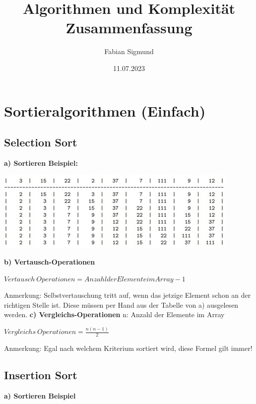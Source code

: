\documentclass[12pt]{article}
\title{Algorithmen und Komplexität Zusammenfassung}
\author{Fabian Sigmund}
\date{11.07.2023}
\begin{document}
	\maketitle
	\pagebreak
	\section{Sortieralgorithmen (Einfach)}
	\subsection{Selection Sort}
	
	\textbf{a) Sortieren Beispiel:}
	
	\includegraphics{SelectionSort}
	\break
	
	\textbf{b) Vertausch-Operationen} \hfill \break
	
			\begin{center}
		$Vertausch \ Operationen = Anzahl der Elemente im Array - 1$
	\end{center}
	
	Anmerkung: Selbstvertauschung tritt auf, wenn das jetzige Element schon an der richtigen Stelle ist. Diese müssen per Hand aus der Tabelle von a) ausgelesen werden.
	\newline
	\newline
	\textbf{c) Vergleichs-Operationen}
	\newline
	\newline
	n: Anzahl der Elemente im Array
	
	\begin{center}
		$Vergleichs \ Operationen = $\Large{$\frac{n(n-1)}{2}$}
	\end{center}
	
	Anmerkung: Egal nach welchem Kriterium sortiert wird, diese Formel gilt immer!
	
	\pagebreak
	
	
	\subsection{Insertion Sort}
	\textbf{a) Sortieren Beispiel}
	
\end{document}
